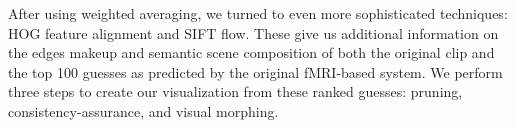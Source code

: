 After using weighted averaging, we turned to even more sophisticated techniques: HOG feature alignment and SIFT flow.  These give us additional information on the edges makeup and semantic scene composition of both the original clip and the top 100 guesses as predicted by the original fMRI-based system.  We perform three steps to create our visualization from these ranked guesses: pruning, consistency-assurance, and visual morphing.